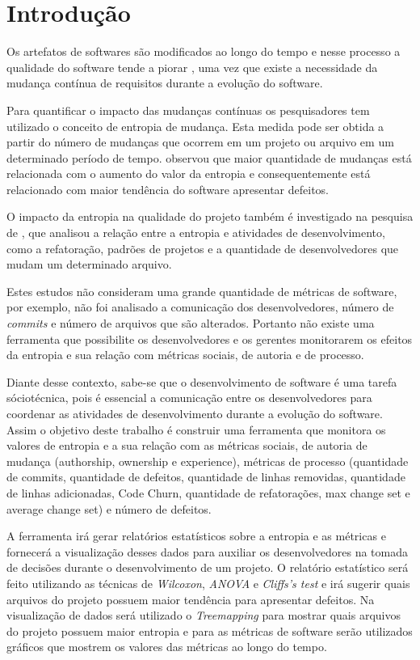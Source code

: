 \chapter{Introdução}

Os artefatos de softwares são modificados ao longo do tempo e nesse processo a qualidade do software tende a piorar \cite{Hassan:2009:PFU:1555001.1555024}, uma vez que existe a necessidade da mudança contínua de requisitos durante a evolução do software.

Para quantificar o impacto das mudanças contínuas os pesquisadores \cite{Hassan:2009:PFU:1555001.1555024}  tem utilizado o conceito de entropia de mudança. Esta medida pode ser obtida a partir do número de mudanças que ocorrem em um projeto ou arquivo em um determinado período de tempo.  observou que maior quantidade de mudanças está relacionada com o aumento do valor da entropia e consequentemente está relacionado com maior tendência do software apresentar defeitos. 

O impacto da entropia na qualidade do projeto também é investigado na pesquisa de , que analisou a relação entre a entropia e atividades de desenvolvimento, como a refatoração, padrões de projetos e a quantidade de desenvolvedores que mudam um determinado arquivo.

Estes estudos não consideram uma grande quantidade de métricas de software, por exemplo, não foi analisado a comunicação dos desenvolvedores, número de \textit{commits} e número de arquivos que são alterados. Portanto não existe uma ferramenta que possibilite os desenvolvedores e os gerentes monitorarem os efeitos da entropia e sua relação com métricas sociais, de autoria e de processo.

Diante desse contexto, sabe-se que o desenvolvimento de software é uma tarefa sóciotécnica, pois é essencial a comunicação entre os desenvolvedores para coordenar as atividades de desenvolvimento durante a evolução do software. Assim o objetivo deste trabalho é construir uma ferramenta que monitora os valores de entropia e a sua relação com as métricas sociais, de autoria de mudança (authorship, ownership e experience), métricas de processo (quantidade de commits, quantidade de defeitos, quantidade de linhas removidas, quantidade de linhas adicionadas, Code Churn, quantidade de refatorações, max change set e average change set) e número de defeitos.

A ferramenta irá gerar relatórios estatísticos sobre a entropia e as métricas e fornecerá a visualização desses dados para auxiliar os desenvolvedores na tomada de decisões durante o desenvolvimento de um projeto. O relatório estatístico será feito utilizando as técnicas de \textit{Wilcoxon}, \textit{ANOVA} e \textit{Cliffs's test} e irá sugerir quais arquivos do projeto possuem maior tendência para apresentar defeitos. Na visualização de dados será utilizado o \textit{Treemapping} para  mostrar quais arquivos do projeto possuem maior entropia e para as métricas de software serão utilizados gráficos que mostrem os valores das métricas ao longo do tempo.


